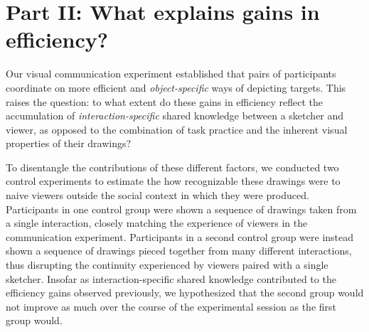 \documentclass[10pt,letterpaper]{article}
\newcommand{\ndg}[1]{{\textcolor{Green}{[ndg: #1]}}}
\begin{document}

\section{Part II: What explains gains in efficiency?}

Our visual communication experiment established that pairs of participants coordinate on more efficient and \emph{object-specific} ways of depicting targets. %
This raises the question: to what extent do these gains in efficiency reflect the accumulation of \emph{interaction-specific} shared knowledge between a sketcher and viewer, as opposed to the combination of task practice and the inherent visual properties of their drawings?

To disentangle the contributions of these different factors, we conducted two control experiments to estimate the how recognizable these drawings were to naive viewers outside the social context in which they were produced.
Participants in one control group were shown a sequence of drawings taken from a single interaction, closely matching the experience of viewers in the communication experiment.
Participants in a second control group were instead shown a sequence of drawings pieced together from many different interactions, thus disrupting the continuity experienced by viewers paired with a single sketcher.
Insofar as interaction-specific shared knowledge contributed to the efficiency gains observed previously, we hypothesized that the second group would not improve as much over the course of the experimental session as the first group would.

\end{document}

